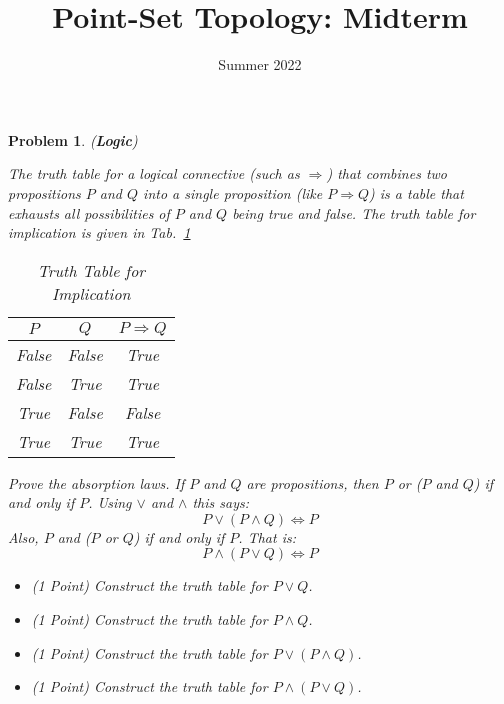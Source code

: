 \documentclass{article}
\title{Point-Set Topology: Midterm}
\date{Summer 2022}
\theoremstyle{normal}
\newtheorem{problem}{Problem}
\begin{document}
    \maketitle
    \begin{problem}
        (\textbf{Logic})
        \par\hfill\par
        The truth table for a logical connective (such as $\Rightarrow$) that
        combines two propositions $P$ and $Q$ into a single proposition
        (like $P\Rightarrow{Q}$) is a table that exhausts all possibilities of
        $P$ and $Q$ being true and false. The truth table for implication is
        given in Tab.~\ref{tab:truth_table_implication}
        \begin{table}[H]
            \centering
            \begin{tabular}{ c | c | c }
                $P$&$Q$&$P\Rightarrow{Q}$\\
                \hline
                False&False&True\\
                False&True&True\\
                True&False&False\\
                True&True&True
            \end{tabular}
            \caption{Truth Table for Implication}
            \label{tab:truth_table_implication}
        \end{table}
        Prove the absorption laws. If $P$ and $Q$ are propositions, then
        $P$ \textit{or} ($P$ \textit{and} $Q$) if and only if $P$. Using
        $\lor$ and $\land$ this says:
        \begin{equation}
            P\lor(P\land{Q})\Leftrightarrow{P}
        \end{equation}
        Also, $P$ \textit{and} ($P$ \textit{or} $Q$) if and only if $P$.
        That is:
        \begin{equation}
            P\land(P\lor{Q})\Leftrightarrow{P}
        \end{equation}
        \begin{itemize}
            \item (1 Point) Construct the truth table for $P\lor{Q}$.
            \item (1 Point) Construct the truth table for $P\land{Q}$.
            \item (1 Point) Construct the truth table for $P\lor(P\land{Q})$.
            \item (1 Point) Construct the truth table for $P\land(P\lor{Q})$.

\end{itemize}
\end{problem}
\end{document}
